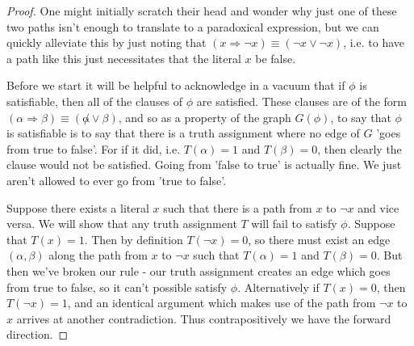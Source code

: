 \begin{proof}
    One might initially scratch their head and wonder why just one of these two paths isn't enough to translate to a paradoxical expression, but we can quickly alleviate this by just noting that $(x \Rightarrow \neg x) \equiv (\neg x \vee \neg x)$, i.e. to have a path like this just necessitates that the literal $x$ be false.
    \par Before we start it will be helpful to acknowledge in a vacuum that if $\phi$ is satisfiable, then all of the clauses of $\phi$ are satisfied. These clauses are of the form $(\alpha \Rightarrow \beta) \equiv (\not \alpha \vee \beta)$, and so as a property of the graph $G(\phi)$, to say that $\phi$ is satisfiable is to say that there is a truth assignment where no edge of $G$ 'goes from true to false'. For if it did, i.e. $T(\alpha)=1$ and $T(\beta)=0$, then clearly the clause would not be satisfied. Going from 'false to true' is actually fine. We just aren't allowed to ever go from 'true to false'.
    \par Suppose there exists a literal $x$ such that there is a path from $x$ to $\neg x$ and vice versa. We will show that any truth assignment $T$ will fail to satisfy $\phi$. Suppose that $T(x) = 1$. Then by definition $T(\neg x) = 0$, so there must exist an edge $(\alpha,\beta)$ along the path from $x$ to $\neg x$ such that $T(\alpha)=1$ and $T(\beta)=0$. But then we've broken our rule - our truth assignment creates an edge which goes from true to false, so it can't possible satisfy $\phi$. Alternatively if $T(x)=0$, then $T(\neg x)=1$, and an identical argument which makes use of the path from $\neg x$ to $x$ arrives at another contradiction. Thus contrapositively we have the forward direction.

\end{proof}
